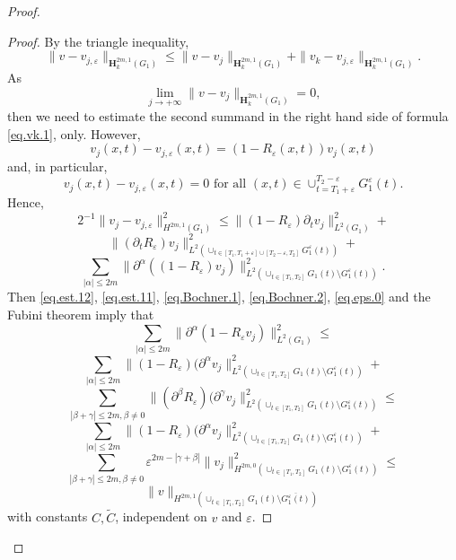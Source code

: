 \documentclass{amsart}
\theoremstyle{definition}
\theoremstyle{remark}
\numberwithin{equation}{section}
\begin{document}
\begin{proof}
\begin{proof}
By the triangle inequality, 
\begin{equation} \label{eq.vk.1}
\|v - v_{j,\varepsilon} \|_{{\mathbf H}_k^{2m,1} (G_1)} \leq 
\|v - v_{j} \|_{{\mathbf H}_k^{2m,1} (G_1)} + 
\|v _k - v_{j,\varepsilon} \|_{{\mathbf H}_k^{2m,1} (G_1)} .
\end{equation}
As 
\begin{equation} \label{eq.lim.1}
\lim_{j\to + \infty}\|v - v_{j} \|_{{\mathbf H}_k^{2m,1} (G_1)} =0,
\end{equation}
then we need to estimate the second summand in the right hand side of formula 
\eqref{eq.vk.1}, only. However,  
$$
v _j (x,t)- v_{j,\varepsilon} (x,t) = 
(1-R_\varepsilon (x,t)) v_j (x,t)
$$
and, in particular,  
\begin{equation} \label{eq.eps.0}
v _j (x,t)- v_{j,\varepsilon} (x,t) = 0 \mbox{ for all } (x,t) \in 
\cup_{t=T_1+\varepsilon}^{T_2-\varepsilon}G_1 ^{\varepsilon} (t) .
\end{equation}
Hence, 
\begin{equation} \label{eq.eps}
2^{-1}\|v _j - v_{j,\varepsilon}\|^2_{H^{2m,1} (G_1)} \leq  
\|(1-R_\varepsilon)  \partial_t v_j \|^2
_{L^{2} (G_1)} + 
\end{equation}
$$
\Big\|  (\partial_t R_\varepsilon) 
v_j \Big\|^2 _{L^{2} (\cup_{t\in [T_1,T_1+\varepsilon] \cup [T_2-\varepsilon ,T_2]}
G_1 ^{\varepsilon} (t) )} +
$$
$$
\sum_{ |\alpha| \leq 2m}
\| \partial^{\alpha} ((1-R_\varepsilon)   v_j) \|^2
_{L^{2} (\cup_{t\in [T_1,T_2]} G_1 (t)  \setminus G_1^{\varepsilon} (t))} . 
$$
Then \eqref{eq.est.12}, 
\eqref{eq.est.11},  \eqref{eq.Bochner.1}, \eqref{eq.Bochner.2}, \eqref{eq.eps.0} 
and the Fubini theorem imply that  
\begin{equation} \label{eq.eps.1}
\sum_{ |\alpha| \leq 2m}
\| \partial^{\alpha} (1-R_\varepsilon   v_j) \|^2
_{L^{2} (G_1)}  
\leq 
\end{equation}
$$
\sum_{|\alpha| \leq 2m } 
\|(1-R_\varepsilon)(  \partial^{\alpha} v_j \|^2
_{L^{2} (\cup_{t\in [T_1,T_2]} G_1 (t)  \setminus G_1^{\varepsilon} (t))}  +
$$
$$
\sum_{|\beta+\gamma| \leq 2m , \beta \ne 0} 
\|(\partial^{\beta}R_\varepsilon)(  \partial^{\gamma} v_j \|^2
_{L^{2} (\cup_{t\in [T_1,T_2]} G_1 (t)  \setminus G_1^{\varepsilon} (t))}  \leq 
$$
$$
\sum_{|\alpha| \leq 2m } 
\|(1-R_\varepsilon)(  \partial^{\alpha} v_j \|^2
_{L^{2} (\cup_{t\in [T_1,T_2]} G_1 (t)  \setminus G_1^{\varepsilon} (t))}  +
$$
$$
\sum_{|\beta+\gamma| \leq 2m , \beta \ne 0} 
\varepsilon^{2m-|\gamma+\beta|}\|   v_j \|^2
_{H^{2m,0} (\cup_{t\in [T_1,T_2]} G_1 (t)  \setminus G_1^{\varepsilon} (t))}  \leq 
$$
$$
\| v\|_{H^{2m,1} (\cup_{t\in [T_1,T_2]}  
G_1 (t) \setminus \overline{G_1^{\varepsilon} (t) })}
$$
with constants $C,\tilde C$, independent on $v$ and $\varepsilon$. 


\end{proof}
\end{proof}
\end{document}
